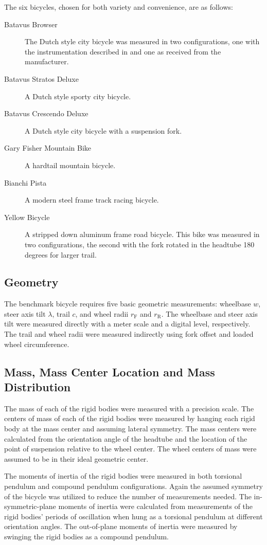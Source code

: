 \documentclass{bmd2010a}
\begin{document}
The six bicycles, chosen for both variety and convenience, are as follows:
\begin{description}
    \item[Batavus Browser] The Dutch style city bicycle was measured
        in two configurations, one with the instrumentation described in
        \cite{Kooijman2009a} and one as received from the manufacturer.
    \item[Batavus Stratos Deluxe] A Dutch style sporty city bicycle.
    \item[Batavus Crescendo Deluxe] A Dutch style city bicycle with a
        suspension fork.
    \item[Gary Fisher Mountain Bike] A hardtail mountain bicycle.
    \item[Bianchi Pista] A modern steel frame track racing bicycle.
    \item[Yellow Bicycle] A stripped down aluminum frame road bicycle. This
        bike was measured in two configurations, the second with the fork
        rotated in the headtube 180 degrees for larger trail.
\end{description}
\subsection*{Geometry}
The benchmark bicycle requires five basic geometric measurements: wheelbase
$w$, steer axis tilt $\lambda$, trail $c$, and wheel radii $r_\mathrm{F}$
and $r_\mathrm{R}$. The wheelbase and steer axis tilt were measured directly
with a meter scale and a digital level, respectively. The trail and wheel radii were
measured indirectly using fork offset and loaded wheel circumference.
\subsection*{Mass, Mass Center Location and Mass Distribution}
The mass of each of the rigid bodies were measured with a precision scale.
The centers of mass of each of the rigid bodies were measured by hanging each
rigid body at the mass center and assuming lateral symmetry. The mass centers
were calculated from the orientation angle of the headtube and the location of
the point of suspension relative to the wheel center.
The wheel centers of mass were assumed to be in their ideal
geometric center.

The moments of inertia of the rigid bodies were measured in both torsional
pendulum and compound pendulum configurations. Again the assumed symmetry of the
bicycle was utilized to reduce the number of measurements needed. The
in-symmetric-plane moments of inertia were calculated from measurements of the
rigid bodies' periods of oscillation when hung as a torsional pendulum at
different orientation angles. The out-of-plane moments of inertia were
measured by swinging the rigid bodies as a compound pendulum.
\end{document}
